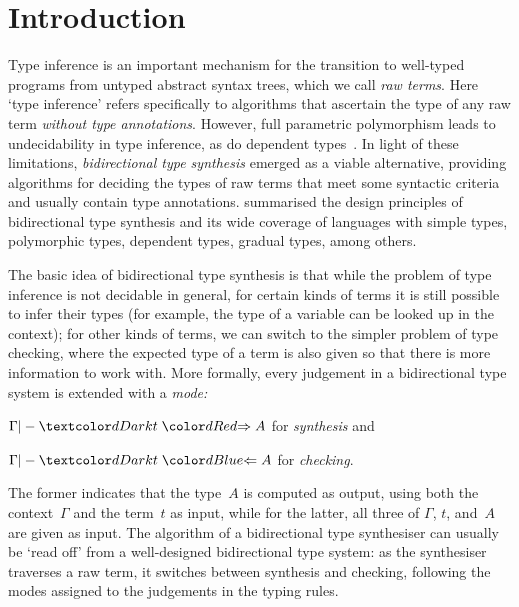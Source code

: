 
\section{Introduction}\label{sec:intro}

Type inference is an important mechanism for the transition to well-typed programs from untyped abstract syntax trees, which we call \emph{raw terms}.
Here `type inference' refers specifically to algorithms that ascertain the type of any raw term \emph{without type annotations}.
However, full parametric polymorphism leads to undecidability in type inference, as do dependent types~\cite{Wells1999,Dowek1993}.
In light of these limitations, \emph{bidirectional type synthesis} emerged as a viable alternative, providing algorithms for deciding the types of raw terms that meet some syntactic criteria and usually contain type annotations.
 summarised the design principles of bidirectional type synthesis and its wide coverage of languages with simple types, polymorphic types, dependent types, gradual types, among others.

The basic idea of bidirectional type synthesis is that while the problem of type inference is not decidable in general, for certain kinds of terms it is still possible to infer their types (for example, the type of a variable can be looked up in the context); for other kinds of terms, we can switch to the simpler problem of type checking, where the expected type of a term is also given so that there is more information to work with.
More formally, every judgement in a bidirectional type system is extended with a \emph{mode:}
\begin{inlineenum}
  \item $\Gamma |- \isTerm{t} \syn A$ for \emph{synthesis} and 
  \item $\Gamma |- \isTerm{t} \chk A$ for \emph{checking}.
\end{inlineenum}
The former indicates that the type~$A$ is computed as output, using both the context~$\Gamma$ and the term~$t$ as input, while for the latter, all three of $\Gamma$, $t$, and~$A$ are given as input.
The algorithm of a bidirectional type synthesiser can usually be `read off' from a well-designed bidirectional type system: as the synthesiser traverses a raw term, it switches between synthesis and checking, following the modes assigned to the judgements in the typing rules.

